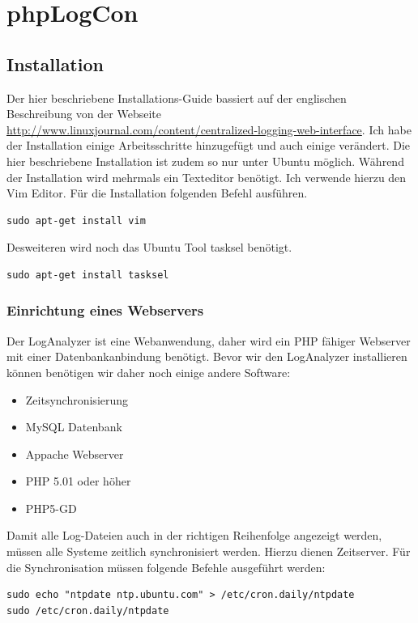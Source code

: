 \section{phpLogCon}
\subsection{Installation}
Der hier beschriebene Installations-Guide bassiert auf der englischen Beschreibung von der Webseite \\
\url{http://www.linuxjournal.com/content/centralized-logging-web-interface}.
Ich habe der Installation einige Arbeitsschritte hinzugefügt und auch einige verändert. Die hier beschriebene Installation ist zudem so nur unter Ubuntu möglich. Während der Installation wird mehrmals ein Texteditor benötigt. Ich verwende hierzu den Vim Editor. Für die Installation folgenden Befehl ausführen.

\begin{lstlisting}
sudo apt-get install vim
\end{lstlisting}

Desweiteren wird noch das Ubuntu Tool tasksel benötigt.

\begin{lstlisting}
sudo apt-get install tasksel
\end{lstlisting}

\subsubsection{Einrichtung eines Webservers}

Der LogAnalyzer ist eine Webanwendung, daher wird ein PHP fähiger Webserver mit einer Datenbankanbindung benötigt. Bevor wir den LogAnalyzer installieren können benötigen wir daher noch einige andere Software:

\begin{itemize}
\item Zeitsynchronisierung
\item MySQL Datenbank
\item Appache Webserver
\item PHP 5.01 oder höher
\item PHP5-GD
\end{itemize}

Damit alle Log-Dateien auch in der richtigen Reihenfolge angezeigt werden, müssen alle Systeme zeitlich synchronisiert werden. Hierzu dienen Zeitserver. Für die Synchronisation müssen folgende Befehle ausgeführt werden:
\begin{lstlisting}
sudo echo "ntpdate ntp.ubuntu.com" > /etc/cron.daily/ntpdate
sudo /etc/cron.daily/ntpdate
\end{lstlisting}

